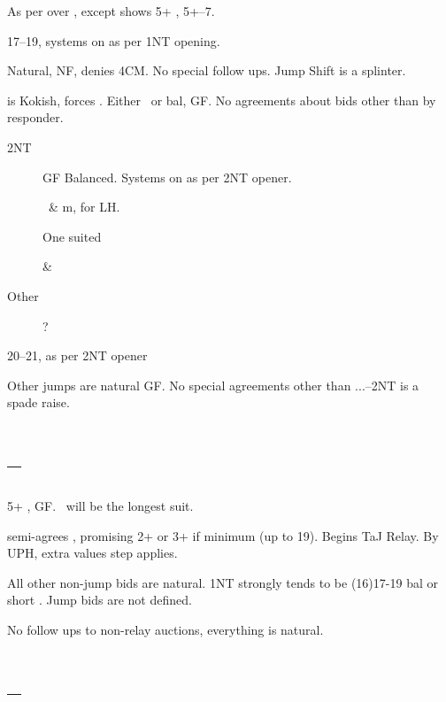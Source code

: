\documentclass[tom-ari]{subfile}
\begin{document}
	
	As per over , except  shows 5+ \heartsuit, 5+--7.
	
	
	17--19, systems on as per 1NT opening.
	
	
	Natural, NF, denies 4CM.  No special follow ups. Jump Shift is a splinter.
	
	
	 is Kokish, forces .  Either \heartsuit ~or bal, GF.  No agreements about bids other than  by responder.
	
	\begin{description}
		\item[2NT] GF Balanced.  Systems on as per 2NT opener.
		\item[] \heartsuit ~\& m,  for LH.
		\item[] One suited \heartsuit
		\item[] \heartsuit \& ~\spadesuit
		\item[Other] ?
	\end{description} 

	
	20--21, as per 2NT opener
	
	
	Other jumps are natural GF.  No special agreements other than ...--2NT is a spade raise.
	
	\section[1C--1H]{--}
	
	5+ \spadesuit, GF.  \spadesuit ~will be the longest suit.
	
	 semi-agrees \spadesuit, promising 2+ or 3+ if minimum (up to 19).  Begins TaJ Relay.  By UPH, extra values step applies.
	
	All other non-jump bids are natural.  1NT strongly tends to be (16)17-19 bal or short \spadesuit.  Jump bids are not defined.
	
	No follow ups to non-relay auctions, everything is natural. 
	
	\section[1C--1S]{--}
	
\end{document}
